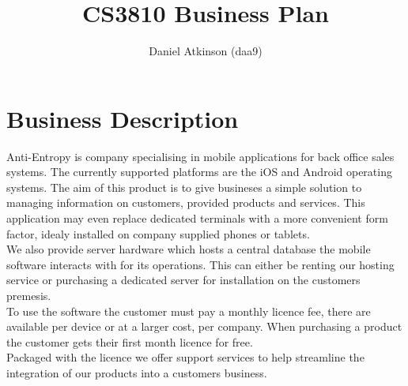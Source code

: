 \documentclass{article}
\begin{document}
\title{CS3810 Business Plan}

\author{Daniel Atkinson (daa9)}
\maketitle

\newpage
\tableofcontents
\newpage

\section{Business Description}
Anti-Entropy is company specialising in mobile applications for back office sales systems.  The currently supported platforms are the iOS and Android operating systems.  The aim of this product is to give busineses a simple solution to managing information on customers, provided products and services.  This application may even replace dedicated terminals with a more convenient form factor, idealy installed on company supplied phones or tablets.
\\We also provide server hardware which hosts a central database the mobile software interacts with for its operations.  This can either be renting our hosting service or purchasing a dedicated server for installation on the customers premesis.
\\To use the software the customer must pay a monthly licence fee, there are available per device or at a larger cost, per company.  When purchasing a product the customer gets their first month licence for free.
\\Packaged with the licence we offer support services to help streamline the integration of our products into a customers business.
\end{document}
